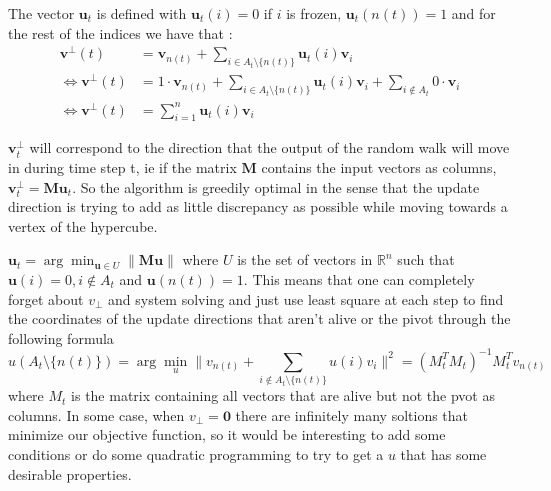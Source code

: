 \documentclass[12pt]{article}
\begin{document}
The vector $\textbf{u}_t$ is defined with $\textbf{u}_t(i)=0$ if $i$ is frozen, $\textbf{u}_t(n(t))=1$ and for the rest of the indices we have that :
\begin{align*}
\textbf{v}^\perp(t) &= \textbf{v}_{n(t)} + \sum_{i \in A_t \setminus \{n(t)\}} \textbf{u}_t(i)\textbf{v}_i\\
\Leftrightarrow \textbf{v}^\perp(t) &= 1 \cdot \textbf{v}_{n(t)} + \sum_{i \in A_t \setminus \{n(t)\}} \textbf{u}_t(i)\textbf{v}_i + \sum_{i \notin A_t} 0 \cdot \textbf{v}_i\\
\Leftrightarrow \textbf{v}^\perp(t) &= \sum_{i=1}^n \textbf{u}_t(i)\textbf{v}_i
\end{align*}

$\textbf{v}^\perp_t$ will correspond to the direction that the output of the random walk will move in during time step t, ie if the matrix $\textbf{M}$ contains the input vectors as columns, $\textbf{v}^\perp_t = \textbf{Mu}_t$. So the algorithm is greedily optimal in the sense that the update direction is trying to add as little discrepancy as possible while moving towards a vertex of the hypercube.

$\textbf{u}_t = \arg\min_{\textbf{u} \in U} \|\textbf{Mu}\|$ where $U$ is the set of vectors in $\mathbb{R}^n$ such that $\textbf{u}(i) = 0 , i \not\in A_t$ and $\textbf{u}(n(t))=1$. This means that one can completely forget about $v_\perp$ and system solving and just use least square at each step to find the coordinates of the update directions that aren't alive or the pivot through the following formula $$u(A_t\setminus\{n(t)\})=\arg\min_u\|v_{n(t)}+\sum_{i\not\in A_t\setminus\{n(t)\}}u(i)v_i\|^2=(M_t^TM_t)^{-1}M_t^Tv_{n(t)}$$ where $M_t$ is the matrix containing all vectors that are alive but not the pvot as columns. In some case, when $v_\perp=\textbf{0}$ there are infinitely many soltions that minimize our objective function, so it would be interesting to add some conditions or do some quadratic programming to try to get a $u$ that has some desirable properties.
\end{document}
